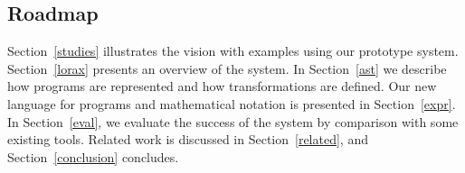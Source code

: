 







%




\subsection{Roadmap}
Section~\ref{studies} illustrates the vision with examples using our prototype system. Section~\ref{lorax} presents an overview of the system. In Section~\ref{ast} we describe how programs are represented and how transformations are defined. Our new language for programs and mathematical notation is presented in Section~\ref{expr}. In Section~\ref{eval}, we evaluate the success of the system by comparison with some existing tools. Related work is discussed in Section~\ref{related}, and Section~\ref{conclusion} concludes.
